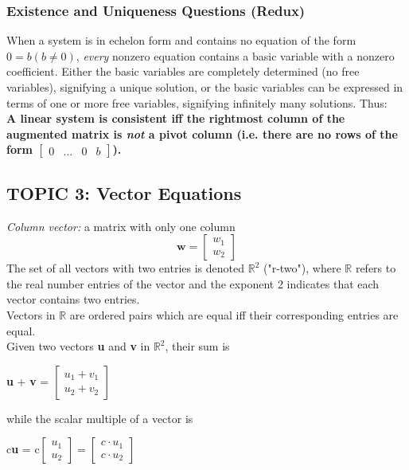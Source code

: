 \documentclass[12pt]{article} %
\newcommand{\R}{\mathbb{R}}
\begin{document}
\subsubsection{Existence and Uniqueness Questions (Redux)}
When a system is in echelon form and contains no equation of the form $0 = b (b \neq 0)$, \emph{every} nonzero equation contains a basic variable with a nonzero coefficient. Either the basic variables are completely determined (no free variables), signifying a unique solution, or the basic variables can be expressed in terms of one or more free variables, signifying infinitely many solutions. Thus:\\
\textbf{A linear system is consistent iff the rightmost column of the augmented matrix is \emph{not} a pivot column (i.e. there are no rows of the form $\begin{bmatrix} 0 & ... & 0 & b\end{bmatrix}$).}


\pagebreak
\subsection{TOPIC 3: Vector Equations}
\emph{Column vector:} a matrix with only one column
$$\mathbf{w}= \begin{bmatrix}w_1 \\ w_2 \end{bmatrix}$$
The set of all vectors with two entries is denoted $\mathbb{R}^2$ ("r-two"), where $\mathbb{R}$ refers to the real number entries of the vector and the exponent 2 indicates that each vector contains two entries.\\
Vectors in $\mathbb{R}$ are ordered pairs which are equal iff their corresponding entries are equal.\\

Given two vectors \textbf{u} and \textbf{v} in $\R^2$, their sum is 
\begin{center}\textbf{u} + \textbf{v} = $\begin{bmatrix}u_1 + v_1 \\ u_2 + v_2\end{bmatrix}$\end{center}
while the scalar multiple of a vector is 
\begin{center}c\textbf{u} = c$\begin{bmatrix}u_1 \\ u_2\end{bmatrix} =\begin{bmatrix}c\cdot u_1 \\ c\cdot u_2\end{bmatrix}  $\end{center}
\end{document}
